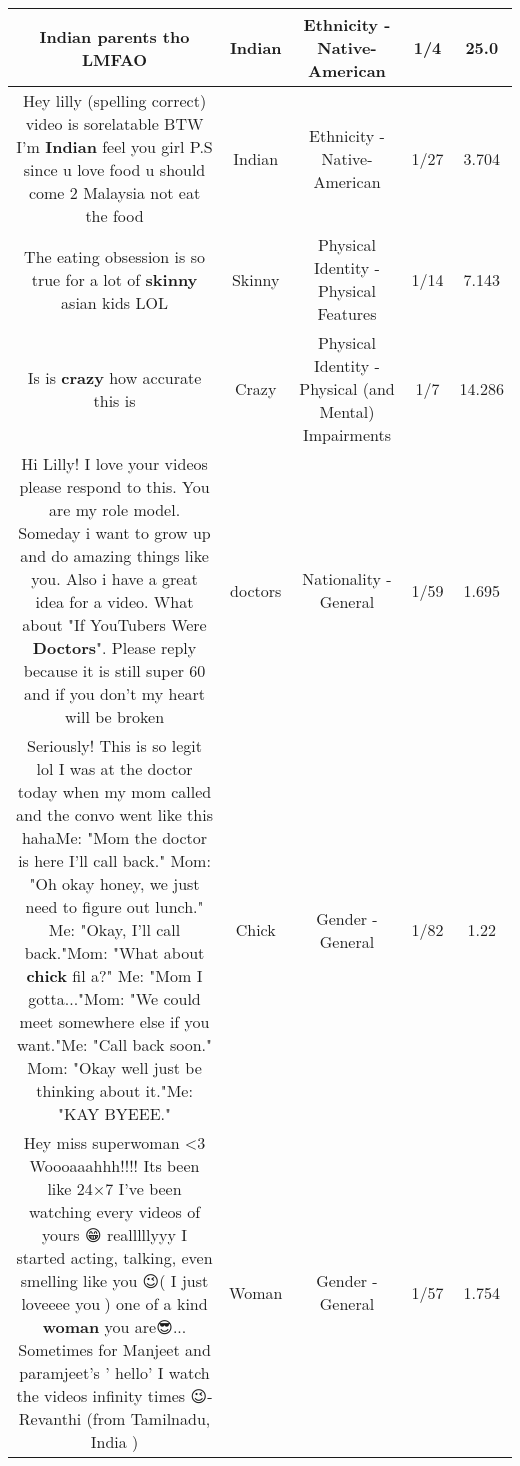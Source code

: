 \documentclass[11pt]{article}
\newlength\mylength
\begin{document}
\begin{center}
\begin{longtable}{|C{.65\mylength}|C{.30\mylength}|C{.12\mylength}|C{.12\mylength}|C{.12\mylength}|}
  \small Indian parents tho LMFAO\normalsize   & Indian & Ethnicity - Native-American & 1/4 & 25.0 \\  \hline
  \small Hey lilly (spelling correct) video is sorelatable BTW I'm \textbf{Indian} feel you girl  P.S since u love food u should come 2 Malaysia not eat the food\normalsize   & Indian & Ethnicity - Native-American & 1/27 & 3.704 \\  \hline
  \small The eating obsession is so true for a lot of \textbf{skinny} asian kids LOL\normalsize   & Skinny & Physical Identity - Physical Features & 1/14 & 7.143 \\  \hline
  \small Is is \textbf{crazy} how accurate this is\normalsize   & Crazy & Physical Identity - Physical (and Mental) Impairments & 1/7 & 14.286 \\  \hline
  \small Hi Lilly! I love your videos please respond to this. You are my role model. Someday i want to grow up and do amazing things like you. Also i have a great idea for a video. What about "If YouTubers Were \textbf{Doctors}". Please reply because it is still super 60 and if you don't my heart will be broken\normalsize   & doctors & Nationality - General & 1/59 & 1.695 \\  \hline
  \small Seriously! This is so legit lol I was at the doctor today when my mom called and the convo went like this hahaMe: "Mom the doctor is here I'll call back." Mom: "Oh okay honey, we just need to figure out lunch." Me: "Okay, I'll call back."Mom: "What about \textbf{chick} fil a?" Me: "Mom I gotta..."Mom: "We could meet somewhere else if you want."Me: "Call back soon." Mom: "Okay well just be thinking about it."Me: "KAY BYEEE."\normalsize   & Chick & Gender - General & 1/82 & 1.22 \\  \hline
  \small Hey miss superwoman <3 Woooaaahhh!!!! Its been like 24×7 I've been watching every videos of yours 😁 realllllyyy I started acting, talking, even smelling like you 😉( I just loveeee you💜) one of a kind \textbf{woman} you are😎... Sometimes for Manjeet and paramjeet's ' hello' I watch the videos infinity times 😉- Revanthi (from Tamilnadu, India )\normalsize   & Woman & Gender - General & 1/57 & 1.754 \\  \hline

\end{longtable}
\end{center}
\end{document}
